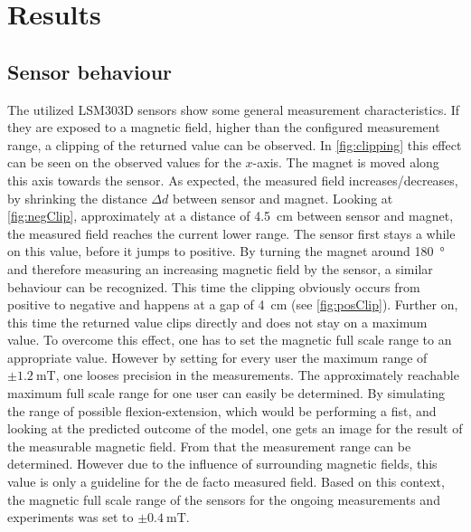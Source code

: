 \lhead[\chaptername~\thechapter]{\rightmark}

\rhead[\leftmark]{}

\lfoot[\thepage]{}

\cfoot{}

\rfoot[]{\thepage}

\chapter{Results} \label{cha:results}

\section{Sensor behaviour} \label{sec:dataRes}

The utilized LSM303D sensors show some general measurement characteristics. If they are exposed to a magnetic field, higher than the configured measurement range, a clipping of the returned value can be observed. In \ref{fig:clipping} this effect can be seen on the observed values for the $ x $-axis. The magnet is moved along this axis towards the sensor. As expected, the measured field increases/decreases, by shrinking the distance $ \Delta d $ between sensor and magnet. Looking at \ref{fig:negClip}, approximately at a distance of \SI{4.5}{\cm} between sensor and magnet, the measured field reaches the current lower range. The sensor first stays a while on this value, before it jumps to positive. By turning the magnet around \SI{180}{\degree} and therefore measuring an increasing magnetic field by the sensor, a similar behaviour can be recognized. This time the clipping obviously occurs from positive to negative and happens at a gap of \SI{4}{\cm} (see \ref{fig:posClip}). Further on, this time the returned value clips directly and does not stay on a maximum value. To overcome this effect, one has to set the magnetic full scale range to an appropriate value. However by setting for every user the maximum range of $ \pm \SI{1.2}{\milli \tesla} $, one looses precision in the measurements. The approximately reachable maximum full scale range for one user can easily be determined. By simulating the range of possible flexion-extension, which would be performing a fist, and looking at the predicted outcome of the  model, one gets an image for the result of the measurable magnetic field. From that the measurement range can be determined. However due to the influence of surrounding magnetic fields, this value is only a guideline for the de facto measured field. Based on this context, the magnetic full scale range of the sensors for the ongoing measurements and experiments was set to $ \pm \SI{0.4}{\milli \tesla} $.

